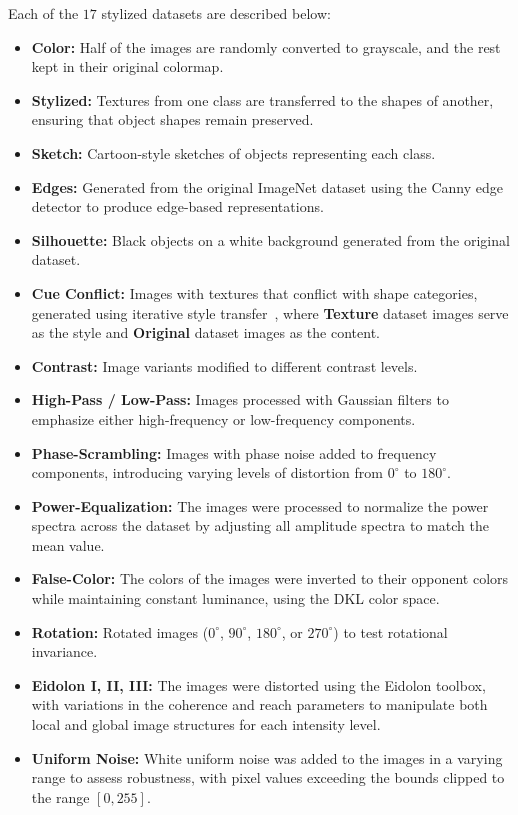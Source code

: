 \documentclass[10pt,letterpaper]{article}
\begin{document}
\noindent
Each of the $17$ stylized datasets are described below:
\begin{itemize}
    \item \textbf{Color:} Half of the images are randomly converted to grayscale, and the rest kept in their original colormap. 
    \item \textbf{Stylized:} Textures from one class are transferred to the shapes of another, ensuring that object shapes remain preserved.
    \item \textbf{Sketch:} Cartoon-style sketches of objects representing each class.  
    \item \textbf{Edges:} Generated from the original ImageNet dataset using the Canny edge detector to produce edge-based representations.
    \item \textbf{Silhouette:} Black objects on a white background generated from the original dataset.
    \item \textbf{Cue Conflict:} Images with textures that conflict with shape categories, generated using iterative style transfer~\citep{gatys2015neural}, where \textbf{Texture} dataset images serve as the style and \textbf{Original} dataset images as the content.
    \item \textbf{Contrast:} Image variants modified to different contrast levels.
    \item \textbf{High-Pass / Low-Pass:} Images processed with Gaussian filters to emphasize either high-frequency or low-frequency components.
    \item \textbf{Phase-Scrambling:} Images with phase noise added to frequency components, introducing varying levels of distortion from $0^\circ$ to $180^\circ$.
    \item \textbf{Power-Equalization:} The images were processed to normalize the power spectra across the dataset by adjusting all amplitude spectra to match the mean value.
    \item \textbf{False-Color:} The colors of the images were inverted to their opponent colors while maintaining constant luminance, using the DKL color space.
    \item \textbf{Rotation:} Rotated images ($0^\circ$, $90^\circ$, $180^\circ$, or $270^\circ$) to test rotational invariance.
    \item \textbf{Eidolon I, II, III:} The images were distorted using the Eidolon toolbox, with variations in the coherence and reach parameters to manipulate both local and global image structures for each intensity level.
    \item \textbf{Uniform Noise:} White uniform noise was added to the images in a varying range to assess robustness, with pixel values exceeding the bounds clipped to the range $[0, 255]$.
\end{itemize}
\end{document}
